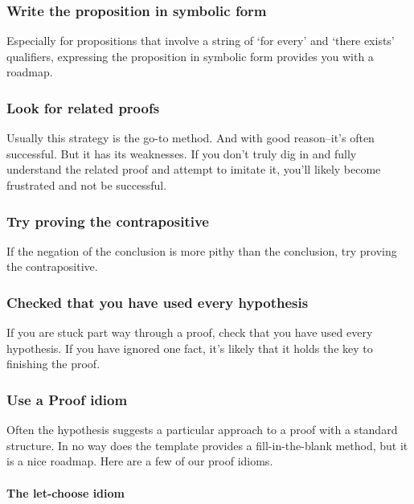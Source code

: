 \documentclass[12pt,fleqn]{article}
\newcounter{ex}\setcounter{ex}{0}
\newcounter{id}\setcounter{id}{0}
\newcounter{se}\setcounter{se}{0}
\begin{document}
 \subsubsection{Write the proposition in symbolic form} 
 
 Especially for propositions 
 that involve a string of `for every' and `there exists' qualifiers,
 expressing the proposition in symbolic form provides you with 
 a roadmap.

 \subsubsection{Look for related proofs} 
 
 Usually this strategy is the go-to 
 method. And with good reason--it's often successful. But it has its 
 weaknesses. If you don't truly dig in and fully understand the related
 proof and attempt to imitate it, you'll likely  become frustrated and 
 not be successful. 

 \subsubsection{Try proving the contrapositive} 
 
 If the negation of the conclusion is 
 more pithy than the conclusion, try proving the contrapositive.


 \subsubsection{Checked that you have used every hypothesis}

 If you are stuck part way through a proof, check that you have
 used every hypothesis.  If you have ignored one fact,  it's likely
 that it holds the key to finishing the proof.
 
 

\subsubsection{Use a  Proof idiom}

Often the hypothesis suggests a particular approach to a proof with a standard structure.  In no way does
the template provides a fill-in-the-blank method, but it is a nice roadmap.  
Here are a few of our proof idioms.

\paragraph{The let-choose idiom}
\end{document}
